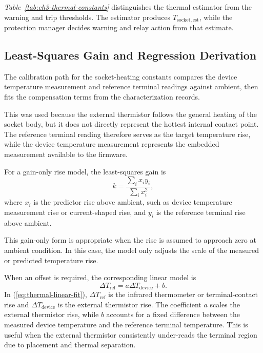 \textit{Table~\ref{tab:ch3-thermal-constants}} distinguishes the thermal estimator from
the warning and trip thresholds. The estimator produces
$T_{\mathrm{socket,est}}$, while the protection manager decides warning and
relay action from that estimate.

\subsection{Least-Squares Gain and Regression Derivation}
\label{sec:ch3-thermal-least-squares}

The calibration path for the socket-heating constants compares the device
temperature measurement and reference terminal readings against ambient, then
fits the compensation terms from the characterization records. 

This was used because the external thermistor follows the general heating of
the socket body, but it does not directly represent the hottest internal
contact point. The reference terminal reading therefore serves as the target
temperature rise, while the device temperature measurement represents the
embedded measurement available to the firmware.

For a gain-only
rise model, the least-squares gain is
\begin{equation}
  k =
  \frac{\sum_i x_i y_i}{\sum_i x_i^2},
  \label{eq:thermal-gain-fit}
\end{equation}
where $x_i$ is the predictor rise above ambient, such as device temperature measurement
rise or current-shaped rise, and $y_i$ is the reference terminal rise above
ambient. 

This gain-only form is appropriate when the rise is assumed to approach zero
at ambient condition. In this case, the model only adjusts the scale of the
measured or predicted temperature rise.

When an offset is required, the corresponding linear model is
\begin{equation}
  \Delta T_{\mathrm{ref}} =
  a\Delta T_{\mathrm{device}} + b .
  \label{eq:thermal-linear-fit}
\end{equation}
In (\ref{eq:thermal-linear-fit}), $\Delta T_{\mathrm{ref}}$ is the infrared
thermometer or terminal-contact rise and $\Delta T_{\mathrm{device}}$ is the
external thermistor rise. 
The coefficient $a$ scales the external thermistor rise, while $b$ accounts
for a fixed difference between the measured device temperature and the
reference terminal temperature. This is useful when the external thermistor
consistently under-reads the terminal region due to placement and thermal
separation.

